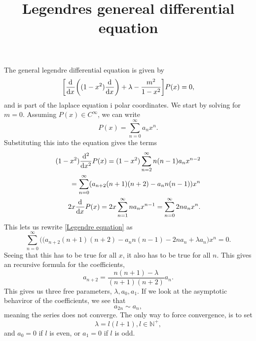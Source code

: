 \documentclass{article}
\title{Legendres genereal differential equation}
\begin{document}
    \maketitle

    The general legendre differential equation is given by 
    \begin{equation}
        \label{Legendre equation}
        \bigg[\d[x] \bigg( (1 - x^2) \d[x] \bigg) + \lambda  - \frac{m^2}{1 - x^2} \bigg] P(x) = 0,
    \end{equation}
    and is part of the laplace equation i polar coordinates. We start by solving for \(m = 0\). Assuming \(P(x) \in C^\infty\), we can write 
    \begin{equation*}
        P(x) = \sum_{n = 0}^\infty a_n x^n.
    \end{equation*}
    Substituting this into the equation gives the terms
    \begin{align*}
        (1-x^2) \d[x]2 P(x) = (1-x^2)\sum_{n=2}^\infty n (n - 1) a_nx^{n-2} 
        \\ = \sum_{n=0}^\infty (a_{n+2}(n + 1)(n+2) - a_n n (n - 1))x^n \\
        2x \d[x] P(x) = 2x \sum_{n = 1}^\infty na_n x^{n - 1} = \sum_{n = 0}^\infty 2 n a_{n} x^{n}. 
    \end{align*} 
    This lets us rewrite \eqref{Legendre equation} as
    \begin{equation*}
        \sum_{n=0}^\infty \big((a_{n+2}(n + 1)(n+2) - a_n n (n - 1) -2n a_{n} + \lambda a_n\big)x^n = 0.
    \end{equation*}
    Seeing that this has to be true for all \(x\), it also has to be true for all \(n\). This gives an recursive formula for the coefficients,
    \begin{equation*}
        a_{n + 2} = \frac{n(n + 1) - \lambda}{(n + 1)(n + 2)}a_n.
    \end{equation*}
    This gives us three free parameters, \(\lambda, a_0, a_1\). If we look at the asymptotic behaviror of the coefficients, we see that
    \begin{equation*}
        a_{2n} \sim a_n, 
    \end{equation*}
    meaning the series does not converge. The only way to force convergence, is to set
    \begin{equation*}
        \lambda = l(l + 1), l \in \mathbb{N^+}, 
    \end{equation*}
    and \(a_0 = 0\) if \(l\) is even, or \(a_1 = 0\) if \(l\) is odd.
\end{document}
